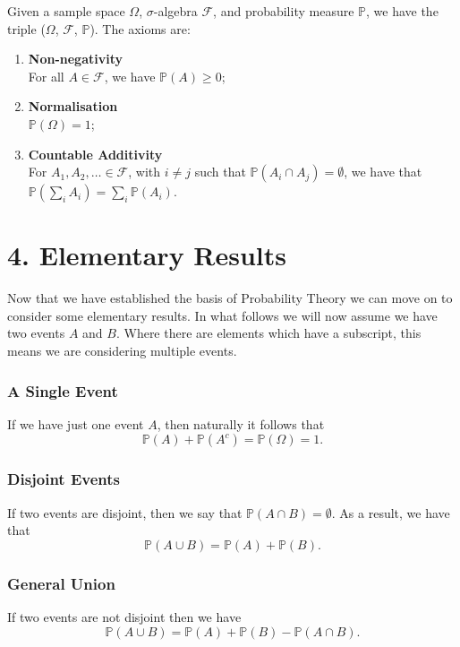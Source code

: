 \documentclass[11pt]{article}
\begin{document}
Given a sample space $\Omega$, $\sigma$-algebra $\mathcal{F}$, and probability measure $\mathbb{P}$, we have the triple ($\Omega$, $\mathcal{F}$, $\mathbb{P}$). The axioms are:
\begin{enumerate}
    \item \textbf{Non-negativity} \\
    For all $A \in \mathcal{F}$, we have $\mathbb{P}(A) \geq 0$;
    \item \textbf{Normalisation} \\
    $\mathbb{P}(\Omega) = 1$;
    \item \textbf{Countable Additivity} \\
    For $A_1, A_2, \ldots \in \mathcal{F}$, with $i \neq j$ such that $\mathbb{P}(A_i \cap A_j) = \emptyset$, we have that \\ $\mathbb{P}(\sum_{i} A_i) = \sum_{i} \mathbb{P}(A_i)$. 
\end{enumerate}

\section*{4. Elementary Results}
Now that we have established the basis of Probability Theory we can move on to consider some elementary results. In what follows we will now assume we have two 
events $A$ and $B$. Where there are elements which have a subscript, this means we are considering multiple events.

\subsubsection*{A Single Event}
If we have just one event $A$, then naturally it follows that
\begin{equation}
    \mathbb{P}(A) + \mathbb{P}(A^c) = \mathbb{P}(\Omega) = 1.
\end{equation}

\subsubsection*{Disjoint Events}
If two events are disjoint, then we say that $\mathbb{P}(A \cap B) = \emptyset$. As a result, we have that 
\begin{equation}
    \mathbb{P}(A \cup B) = \mathbb{P}(A) + \mathbb{P}(B).  
\end{equation}

\subsubsection*{General Union}
If two events are not disjoint then we have
\begin{equation}
    \mathbb{P}(A \cup B) = \mathbb{P}(A) + \mathbb{P}(B) - \mathbb{P}(A \cap B).
\end{equation}
\end{document}
